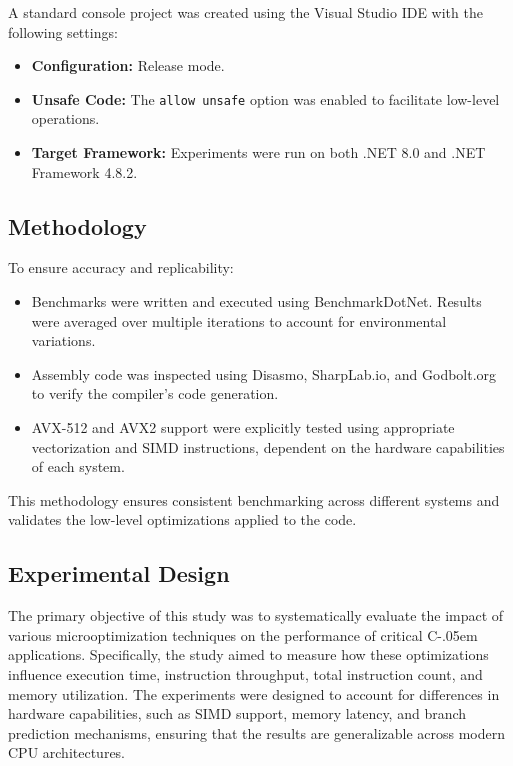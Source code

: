 \documentclass{article}
\newcommand{\Csharp}{%
  {\settoheight{\dimen0}{C}C\kern-.05em \resizebox{!}{\dimen0}{\raisebox{\depth}{\# }}}}
\begin{document}
A standard console project was created using the Visual Studio IDE with the following settings:
\begin{itemize}
    \item \textbf{Configuration:} Release mode.
    \item \textbf{Unsafe Code:} The \texttt{allow unsafe} option was enabled to facilitate low-level operations.
    \item \textbf{Target Framework:} Experiments were run on both .NET 8.0 and .NET Framework 4.8.2.
\end{itemize}

\subsection{Methodology}

To ensure accuracy and replicability:
\begin{itemize}
    \item Benchmarks were written and executed using BenchmarkDotNet. Results were averaged over multiple iterations to account for environmental variations.
    \item Assembly code was inspected using Disasmo, SharpLab.io, and Godbolt.org to verify the compiler's code generation.
    \item AVX-512 and AVX2 support were explicitly tested using appropriate vectorization and SIMD instructions, dependent on the hardware capabilities of each system.
\end{itemize}

This methodology ensures consistent benchmarking across different systems and validates the low-level optimizations applied to the code.

\subsection{Experimental Design}

The primary objective of this study was to systematically evaluate the impact of various microoptimization techniques on the performance of critical \Csharp applications. Specifically, the study aimed to measure how these optimizations influence execution time, instruction throughput, total instruction count, and memory utilization. The experiments were designed to account for differences in hardware capabilities, such as SIMD support, memory latency, and branch prediction mechanisms, ensuring that the results are generalizable across modern CPU architectures.
\end{document}

